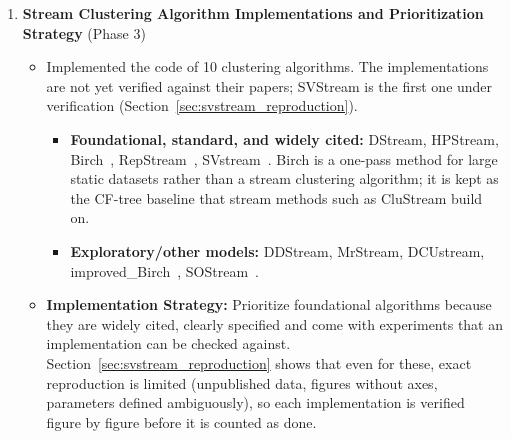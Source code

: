 \begin{enumerate}[label=\textbf{C\arabic*.},leftmargin=2.2em]
  \item \textbf{Stream Clustering Algorithm Implementations and Prioritization Strategy} \hfill{\small(Phase 3)}\\
  \begin{itemize}[leftmargin=1.2em,itemsep=2pt,topsep=1pt]
    \item Implemented the code of 10 clustering algorithms. The implementations are not yet verified against their papers; SVStream is the first one under verification (Section~\ref{sec:svstream_reproduction}).
    \begin{itemize}[leftmargin=1.2em,itemsep=1pt]
      \item \textbf{Foundational, standard, and widely cited:} DStream, HPStream, Birch~\cite{zhang1996birch}, RepStream~\cite{luhr2009repstream}, SVstream~\cite{wang2013svstream}. Birch is a one-pass method for large static datasets rather than a stream clustering algorithm; it is kept as the CF-tree baseline that stream methods such as CluStream build on.
      \item \textbf{Exploratory/other models:} DDStream, MrStream, DCUstream, improved\_Birch~\cite{ismael2014improvedbirch}, SOStream~\cite{isaksson2012sostream}.
    \end{itemize}
    \item \textbf{Implementation Strategy:} Prioritize foundational algorithms because they are widely cited, clearly specified and come with experiments that an implementation can be checked against. Section~\ref{sec:svstream_reproduction} shows that even for these, exact reproduction is limited (unpublished data, figures without axes, parameters defined ambiguously), so each implementation is verified figure by figure before it is counted as done.
  \end{itemize}


\end{enumerate}
